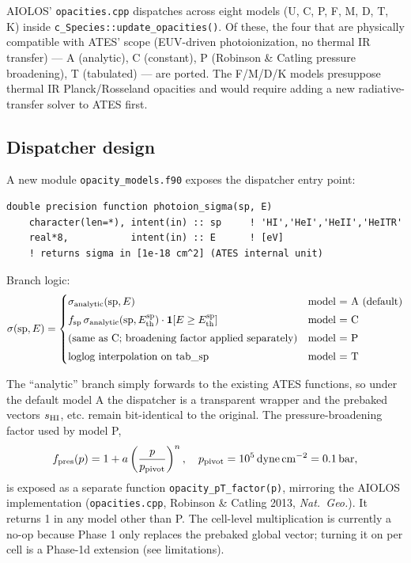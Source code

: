 \documentclass[english,a4paper]{kiseon_memo}
\begin{document}
AIOLOS' \texttt{opacities.cpp} dispatches across eight models (U, C, P, F, M,
D, T, K) inside \texttt{c\_Species::update\_opacities()}. Of these, the four
that are physically compatible with ATES' scope (EUV-driven photoionization,
no thermal IR transfer) --- A (analytic), C (constant), P (Robinson \&
Catling pressure broadening), T (tabulated) --- are ported. The F/M/D/K
models presuppose thermal IR Planck/Rosseland opacities and would require
adding a new radiative-transfer solver to ATES first.

\subsection{Dispatcher design}

A new module \texttt{opacity\_models.f90} exposes the dispatcher entry point:
\begin{verbatim}
double precision function photoion_sigma(sp, E)
    character(len=*), intent(in) :: sp     ! 'HI','HeI','HeII','HeITR'
    real*8,           intent(in) :: E      ! [eV]
    ! returns sigma in [1e-18 cm^2] (ATES internal unit)
\end{verbatim}

Branch logic:
\[
\sigma(\mathrm{sp}, E) =
\begin{cases}
\sigma_{\rm analytic}(\mathrm{sp}, E) & \text{model = A (default)} \\[3pt]
f_{\rm sp}\,\sigma_{\rm analytic}(\mathrm{sp}, E_{\rm th}^{\rm sp}) \cdot \mathbf{1}[E \ge E_{\rm th}^{\rm sp}] & \text{model = C} \\[3pt]
\text{(same as C; broadening factor applied separately)} & \text{model = P} \\[3pt]
\text{loglog interpolation on tab\_sp} & \text{model = T}
\end{cases}
\]

The ``analytic'' branch simply forwards to the existing ATES functions, so
under the default model A the dispatcher is a transparent wrapper and the
prebaked vectors $s_{\rm HI}$, etc. remain bit-identical to the original.
The pressure-broadening factor used by model P,
\[
f_{\rm pres}(p) = 1 + a \left(\frac{p}{p_{\rm pivot}}\right)^n,
\quad p_{\rm pivot} = 10^5 \,\mathrm{dyne\,cm^{-2}} = 0.1\,\mathrm{bar},
\]
is exposed as a separate function \texttt{opacity\_pT\_factor(p)}, mirroring
the AIOLOS implementation (\texttt{opacities.cpp}, Robinson \& Catling 2013,
\textit{Nat.\ Geo.}). It returns 1 in any model other than P. The cell-level
multiplication is currently a no-op because Phase 1 only replaces the
prebaked global vector; turning it on per cell is a Phase-1d extension (see
limitations).
\end{document}
